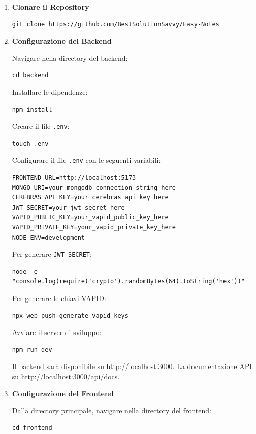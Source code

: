 \begin{enumerate}
    \item \textbf{Clonare il Repository}
    \begin{verbatim}
git clone https://github.com/BestSolutionSavvy/Easy-Notes
    \end{verbatim}

    \item \textbf{Configurazione del Backend}
    \par Navigare nella directory del backend:
    \begin{verbatim}
cd backend
    \end{verbatim}
    
    Installare le dipendenze:
    \begin{verbatim}
npm install
    \end{verbatim}
    
    Creare il file \texttt{.env}:
    \begin{verbatim}
touch .env
    \end{verbatim}
    
    Configurare il file \texttt{.env} con le seguenti variabili:
    \begin{verbatim}
FRONTEND_URL=http://localhost:5173
MONGO_URI=your_mongodb_connection_string_here
CEREBRAS_API_KEY=your_cerebras_api_key_here
JWT_SECRET=your_jwt_secret_here
VAPID_PUBLIC_KEY=your_vapid_public_key_here
VAPID_PRIVATE_KEY=your_vapid_private_key_here
NODE_ENV=development
    \end{verbatim}
    
    Per generare \texttt{JWT\_SECRET}:
    \begin{verbatim}
node -e "console.log(require('crypto').randomBytes(64).toString('hex'))"
    \end{verbatim}
    
    Per generare le chiavi VAPID:
    \begin{verbatim}
npx web-push generate-vapid-keys
    \end{verbatim}
    
    Avviare il server di sviluppo:
    \begin{verbatim}
npm run dev
    \end{verbatim}
    
    Il backend sarà disponibile su \url{http://localhost:3000}. La documentazione API su \url{http://localhost:3000/api/docs}.

    \item \textbf{Configurazione del Frontend}
    \par Dalla directory principale, navigare nella directory del frontend:
    \begin{verbatim}
cd frontend
    \end{verbatim}
    

\end{enumerate}
